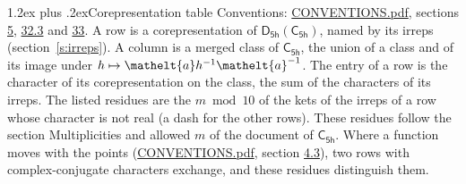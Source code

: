 \documentclass[10pt,a4paper]{article}
\makeatletter
\renewcommand\section{\@startsection{section}{1}{\z@}{-3ex plus -1ex minus -.2ex}%
  {1.2ex plus .2ex}{\normalfont\large\sffamily\bfseries\color{parttitle}}}
\numberwithin{equation}{section}
\newcommand{\eltfont}[1]{{\let\sigma\eltsigma\mathelt{#1}}}
\newcommand{\grp}[1]{\mathsf{#1}}
\newcommand{\elt}[1]{\eltfont{#1}}
\makeatother
\begin{document}
\section{Corepresentation table}\label{s:character_table}
Conventions: \href{../../CONVENTIONS.pdf}{CONVENTIONS.pdf}, sections \href{../../../rotation/CONVENTIONS.pdf\#conv.5}{5}, \href{../../CONVENTIONS.pdf\#conv.32.3}{32.3} and \href{../../CONVENTIONS.pdf\#conv.33}{33}.
A row is a corepresentation of $\grp{D_{5h}}(\grp{C_{5h}})$, named by its irreps (section~\ref{s:irreps}). A column is a merged class of $\grp{C_{5h}}$, the union of a class and of its image under $h \mapsto \elt{a} h^{-1} \elt{a}^{-1}$. The entry of a row is the character of its corepresentation on the class, the sum of the characters of its irreps.
\leavevmode\label{n:head.parity}The listed residues are the $m \bmod 10$ of the kets of the irreps of a row whose character is not real (a dash for the other rows). These residues follow the section Multiplicities and allowed $m$ of the document of \href{../../../rotation/data/pdf/C5h.pdf}{$\grp{C_{5h}}$}. Where a function moves with the points (\href{../../CONVENTIONS.pdf}{CONVENTIONS.pdf}, section \href{../../../rotation/CONVENTIONS.pdf\#conv.4.3}{4.3}), two rows with complex-conjugate characters exchange, and these residues distinguish them.
\end{document}
